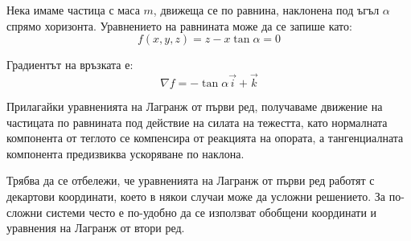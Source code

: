 \documentclass{report}
\begin{document}

{Нека имаме частица с маса $m$, движеща се по равнина, наклонена под ъгъл $\alpha$ спрямо хоризонта. Уравнението на равнината може да се запише като:
\begin{equation}
f(x, y, z) = z - x\tan\alpha = 0
\end{equation}

Градиентът на връзката е:
\begin{equation}
\nabla f = -\tan\alpha\vec{i} + \vec{k}
\end{equation}

Прилагайки уравненията на Лагранж от първи ред, получаваме движение на частицата по равнината под действие на силата на тежестта, като нормалната компонента от теглото се компенсира от реакцията на опората, а тангенциалната компонента предизвиква ускоряване по наклона.}



Трябва да се отбележи, че уравненията на Лагранж от първи ред работят с декартови координати, което в някои случаи може да усложни решението. За по-сложни системи често е по-удобно да се използват обобщени координати и уравнения на Лагранж от втори ред.
\newpage
\end{document}

